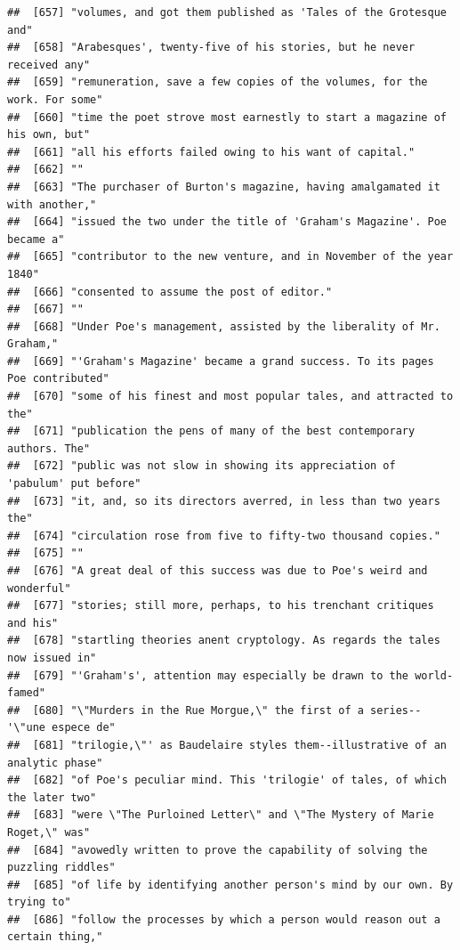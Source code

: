 \documentclass{article}\usepackage[]{graphicx}\usepackage[]{color}
\makeatletter
\newenvironment{kframe}{%
 \def\at@end@of@kframe{}%
 \ifinner\ifhmode%
  \def\at@end@of@kframe{\end{minipage}}%
  \begin{minipage}{\columnwidth}%
 \fi\fi%
 \def\FrameCommand##1{\hskip\@totalleftmargin \hskip-\fboxsep
 \colorbox{shadecolor}{##1}\hskip-\fboxsep
     \hskip-\linewidth \hskip-\@totalleftmargin \hskip\columnwidth}%
 \MakeFramed {\advance\hsize-\width
   \@totalleftmargin\z@ \linewidth\hsize
   \@setminipage}}%
 {\par\unskip\endMakeFramed%
 \at@end@of@kframe}
\newenvironment{knitrout}{}{} %
\makeatother
\begin{document}
\begin{knitrout}
\begin{kframe}
\begin{verbatim}
##  [657] "volumes, and got them published as 'Tales of the Grotesque and"              
##  [658] "Arabesques', twenty-five of his stories, but he never received any"          
##  [659] "remuneration, save a few copies of the volumes, for the work. For some"      
##  [660] "time the poet strove most earnestly to start a magazine of his own, but"     
##  [661] "all his efforts failed owing to his want of capital."                        
##  [662] ""                                                                            
##  [663] "The purchaser of Burton's magazine, having amalgamated it with another,"     
##  [664] "issued the two under the title of 'Graham's Magazine'. Poe became a"         
##  [665] "contributor to the new venture, and in November of the year 1840"            
##  [666] "consented to assume the post of editor."                                     
##  [667] ""                                                                            
##  [668] "Under Poe's management, assisted by the liberality of Mr. Graham,"           
##  [669] "'Graham's Magazine' became a grand success. To its pages Poe contributed"    
##  [670] "some of his finest and most popular tales, and attracted to the"             
##  [671] "publication the pens of many of the best contemporary authors. The"          
##  [672] "public was not slow in showing its appreciation of 'pabulum' put before"     
##  [673] "it, and, so its directors averred, in less than two years the"               
##  [674] "circulation rose from five to fifty-two thousand copies."                    
##  [675] ""                                                                            
##  [676] "A great deal of this success was due to Poe's weird and wonderful"           
##  [677] "stories; still more, perhaps, to his trenchant critiques and his"            
##  [678] "startling theories anent cryptology. As regards the tales now issued in"     
##  [679] "'Graham's', attention may especially be drawn to the world-famed"            
##  [680] "\"Murders in the Rue Morgue,\" the first of a series--'\"une espece de"      
##  [681] "trilogie,\"' as Baudelaire styles them--illustrative of an analytic phase"   
##  [682] "of Poe's peculiar mind. This 'trilogie' of tales, of which the later two"    
##  [683] "were \"The Purloined Letter\" and \"The Mystery of Marie Roget,\" was"       
##  [684] "avowedly written to prove the capability of solving the puzzling riddles"    
##  [685] "of life by identifying another person's mind by our own. By trying to"       
##  [686] "follow the processes by which a person would reason out a certain thing,"    

\end{verbatim}
\end{kframe}
\end{knitrout}
\end{document}
